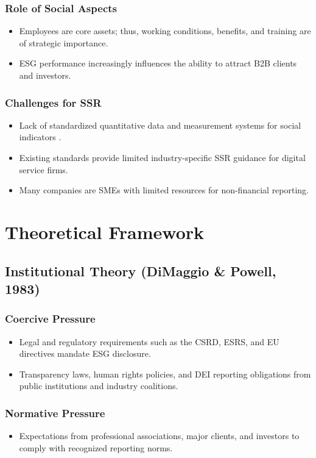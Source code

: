 \subsubsection{Role of Social Aspects}
\begin{itemize}
    \item Employees are core assets; thus, working conditions, benefits, and training are of strategic importance. 
    \item ESG performance increasingly influences the ability to attract B2B clients and investors.
\end{itemize}

\subsubsection{Challenges for SSR}
\begin{itemize}
    \item Lack of standardized quantitative data and measurement systems for social indicators \parencite{Gibbons2024}.
    \item Existing standards provide limited industry-specific SSR guidance for digital service firms.
    \item Many companies are SMEs with limited resources for non-financial reporting.
\end{itemize}

\section{Theoretical Framework}
\subsection{Institutional Theory (DiMaggio \& Powell, 1983)}

\subsubsection{Coercive Pressure}
\begin{itemize}
    \item Legal and regulatory requirements such as the CSRD, ESRS, and EU directives mandate ESG disclosure. 
    \item Transparency laws, human rights policies, and DEI reporting obligations from public institutions and industry coalitions.
\end{itemize}

\subsubsection{Normative Pressure}
\begin{itemize}
    \item Expectations from professional associations, major clients, and investors to comply with recognized reporting norms. 
\end{itemize}

